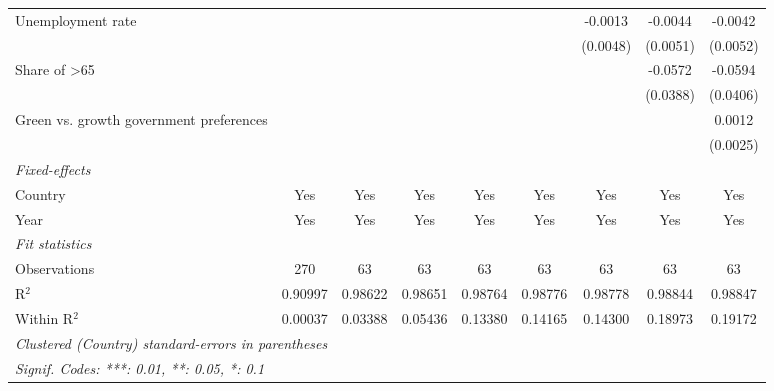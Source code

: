 \begin{table}[htbp]
\begin{tabular}{lcccccccc}
      Unemployment rate                                       &          &          &          &                &                & -0.0013        & -0.0044        & -0.0042\\   
                                                              &          &          &          &                &                & (0.0048)       & (0.0051)       & (0.0052)\\   
      Share of >65                                            &          &          &          &                &                &                & -0.0572        & -0.0594\\   
                                                              &          &          &          &                &                &                & (0.0388)       & (0.0406)\\   
      Green vs. growth government preferences                 &          &          &          &                &                &                &                & 0.0012\\   
                                                              &          &          &          &                &                &                &                & (0.0025)\\   
      \midrule
      \emph{Fixed-effects}\\
      Country                                                 & Yes      & Yes      & Yes      & Yes            & Yes            & Yes            & Yes            & Yes\\  
      Year                                                    & Yes      & Yes      & Yes      & Yes            & Yes            & Yes            & Yes            & Yes\\  
      \midrule
      \emph{Fit statistics}\\
      Observations                                            & 270      & 63       & 63       & 63             & 63             & 63             & 63             & 63\\  
      R$^2$                                                   & 0.90997  & 0.98622  & 0.98651  & 0.98764        & 0.98776        & 0.98778        & 0.98844        & 0.98847\\  
      Within R$^2$                                            & 0.00037  & 0.03388  & 0.05436  & 0.13380        & 0.14165        & 0.14300        & 0.18973        & 0.19172\\  
      \midrule \midrule
      \multicolumn{9}{l}{\emph{Clustered (Country) standard-errors in parentheses}}\\
      \multicolumn{9}{l}{\emph{Signif. Codes: ***: 0.01, **: 0.05, *: 0.1}}\\
   \end{tabular}
\end{table}


